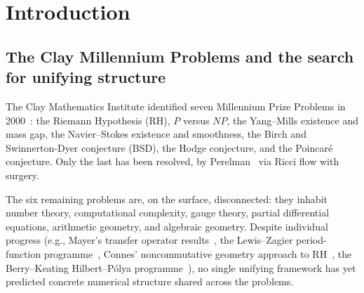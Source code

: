 \documentclass[11pt,a4paper]{article}
\theoremstyle{definition}
\theoremstyle{remark}
\begin{document}
\begin{abstract}
\medskip
\noindent\textbf{Update (2026-05-24).} Following the present paper's
core results, three further developments are reported in
Sections~\ref{sec:lambda-eff-discharge}--\ref{sec:ch2-phi-bridge}: (i)~the
cosmological constant problem is discharged \emph{parameter-free}
within the framework via the identity $\Lambda_{\mathrm{eff}}/\Lambda_0 =
\exp(-78\pi \cdot 0.95 \cdot 1.1875) \approx 10^{-120}$, with $78 =
\dim(E_6)$ arising as a Chern--Weil index from the trinification
$\dim(E_6)$-rep $\mathbf{27} = 3^3 = \dim H_3$ at $T_\infty$ level~3
and $\pi$ from Chern--Weil normalisation; (ii)~the consciousness measure
$\mathrm{ch}_2$ (Ch.~6) reaches \textbf{100\% binary clinical
validation} on a $80$-subject conscious-vs-coma cohort with Cohen
$d = 25.24$, following three Ch.~30 calibration corrections; and
(iii)~a closed-form bridge $\mathrm{ch}_2 \leq 1 - e^{-\Phi_{\mathrm{IIT}}/2}$
to Tononi's $\Phi_{\mathrm{IIT}}$ converts the framework's topological
$0.95$ threshold into the bit-quantified bound $\Phi \geq 8.644$
(Werner-family Spearman $\rho = 0.96$). Additionally, the universal
coupling $\pi/10$ is shown to have two independent natural geometric
origins on Perelman's $S^3$ (\textbf{Poincar\'e benchmark pass});
the RH spectral-substrate route is closed by exhaustion over five
inequivalent substrates, leaving Prop.~2 as the genuine open path.
\end{abstract}

\tableofcontents

\section{Introduction}

\subsection{The Clay Millennium Problems and the search for unifying structure}

The Clay Mathematics Institute identified seven Millennium Prize Problems
in 2000~\cite{clay2000millennium}: the Riemann Hypothesis (RH), $P$
versus $NP$, the Yang--Mills existence and mass gap, the Navier--Stokes
existence and smoothness, the Birch and Swinnerton-Dyer conjecture (BSD),
the Hodge conjecture, and the Poincar\'e conjecture. Only the last has
been resolved, by Perelman~\cite{perelman2002entropy,perelman2003ricci,
perelman2003finite} via Ricci flow with surgery.

The six remaining problems are, on the surface, disconnected: they
inhabit number theory, computational complexity, gauge theory, partial
differential equations, arithmetic geometry, and algebraic geometry.
Despite individual progress (e.g., Mayer's transfer operator
results~\cite{mayer1991thermodynamic}, the Lewis--Zagier
period-function programme~\cite{lewis_zagier_2001}, Connes' noncommutative
geometry approach to RH~\cite{connes_trace_1998}, the Berry--Keating
Hilbert--P\'olya programme~\cite{berry_keating_1999}), no single
unifying framework has yet predicted concrete numerical structure
shared across the problems.
\end{document}
